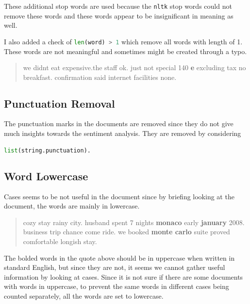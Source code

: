 \documentclass[12pt]{article}
\theoremstyle{remark}
\begin{document}
These additional stop words are used because the \texttt{nltk} stop words could not remove these words and these words appear to be insignificant in meaning as well.

I also added a check of \lstinline[language=python]{len(word) > 1} which remove all words with length of 1. These words are not meaningful and sometimes might be created through a typo.

\begin{quote}
	we didnt eat expensive.the staff ok. just not special 140 \textbf{e} excluding tax no breakfast. confirmation said internet facilities none.
\end{quote}

\subsection{Punctuation Removal}
The punctuation marks in the documents are removed since they do not give much insights towards the sentiment analysis. They are removed by considering

\noindent\hspace{0.35\textwidth}\lstinline[language=python]{list(string.punctuation).}

\subsection{Word Lowercase}
Cases seems to be not useful in the document since by briefing looking at the document, the words are mainly in lowercase.
\begin{quote}
	cozy stay rainy city. husband spent 7 nights \textbf{monaco} early \textbf{january} 2008. business trip chance come ride. we booked \textbf{monte carlo} suite proved comfort\-able longish stay.
\end{quote}
The bolded words in the quote above should be in uppercase when written in standard English, but since they are not, it seems we cannot gather useful information by looking at cases. Since it is not sure if there are some documents with words in uppercase, to prevent the same words in different cases being counted separately, all the words are set to lowercase.
\end{document}
